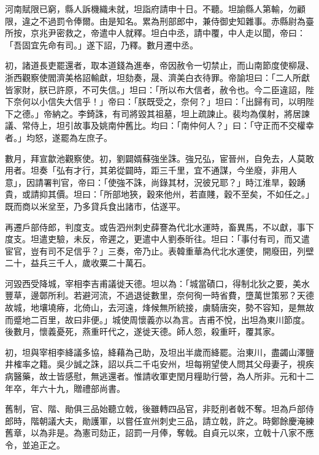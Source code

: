 \begin{pinyinscope}
 河南賦限已窮，縣人訴機織未就，坦詣府請申十日。不聽。坦諭縣人第輸，勿顧限，違之不過罰令俸爾。由是知名。累為刑部郎中，兼侍御史知雜事。赤縣尉為臺所按，京兆尹密救之，帝遣中人就釋。坦白中丞，請中覆，中人走以聞，帝曰：「吾固宜先命有司。」遂下詔，乃釋。數月遷中丞。



 初，諸道長吏罷還者，取本道錢為進奉，帝因赦令一切禁止，而山南節度使柳晟、浙西觀察使閻濟美格詔輸獻，坦劾奏，晟、濟美白衣待罪。帝諭坦曰：「二人所獻皆家財，朕已許原，不可失信。」坦曰：「所以布大信者，赦令也。今二臣違詔，陛下奈何以小信失大信乎！」帝曰：「朕既受之，奈何？」坦曰：「出歸有司，以明陛下之德。」帝納之。李錡誅，有司將毀其祖墓，坦上疏諫止。裴均為僕射，將居諫議、常侍上，坦引故事及姚南仲舊比。均曰：「南仲何人？」曰：「守正而不交權幸者。」均怒，遂罷為左庶子。



 數月，拜宣歙池觀察使。初，劉闢婿蘇強坐誅。強兄弘，宦晉州，自免去，人莫敢用者。坦奏「弘有才行，其弟從闢時，距三千里，宜不通謀，今坐廢，非用人意」，因請署判官，帝曰：「使強不誅，尚錄其材，況彼兄耶？」時江淮旱，穀踴貴，或請抑其價。坦曰：「所部地狹，穀來他州，若直賤，穀不至矣，不如任之。」既而商以米坌至，乃多貸兵食出諸市，估遂平。



 再遷戶部侍郎，判度支。或告泗州刺史薛謇為代北水運時，畜異馬，不以獻，事下度支。坦遣吏驗，未反，帝遲之，更遣中人劉泰昕往。坦曰：「事付有司，而又遣宦官，豈有司不足信乎？」三奏，帝乃止。表韓重華為代北水運使，開廢田，列壁二十，益兵三千人，歲收粟二十萬石。



 河毀西受降城，宰相李吉甫議徙天德。坦以為：「城當磧口，得制北狄之要，美水豐草，邊鄣所利。若避河流，不過退徙數里，奈何徇一時省費，墮萬世策邪？天德故城，地壤墝瘠，北倚山，去河遠，烽候無所統接，虜騎唐突，勢不容知，是無故而蹙地二百里，故曰非便。」城使周懷義亦以為言。吉甫不悅，出坦為東川節度。後數月，懷義憂死，燕重旰代之，遂徙天德。師人怨，殺重旰，覆其家。



 初，坦與宰相李絳議多協，絳藉為己助，及坦出半歲而絳罷。治東川，盡蠲山澤鹽井榷率之籍。吳少誠之誅，詔以兵二千屯安州，坦每朔望使人問其父母妻子，視疾病醫藥，故士皆感慰，無逃還者。惟請收軍吏閏月糧助行營，為人所非。元和十二年卒，年六十九，贈禮部尚書。



 舊制，官、階、勛俱三品始聽立戟，後雖轉四品官，非貶削者戟不奪。坦為戶部侍郎時，階朝議大夫，勛護軍，以嘗任宣州刺史三品，請立戟，許之。時鄭餘慶淹練舊章，以為非是。為憲司劾正，詔罰一月俸，奪戟。自貞元以來，立戟十八家不應令，並追正之。




\end{pinyinscope}
